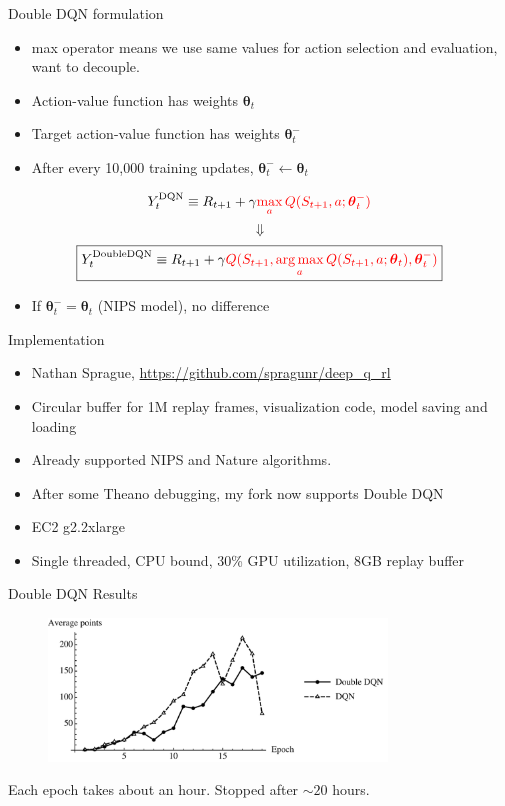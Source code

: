 \documentclass{beamer}
\DeclareMathOperator*{\argmax}{arg\,max}
\begin{document}
\begin{frame}{Double DQN formulation}
  \begin{itemize}
    \item max operator means we use same values for action selection and evaluation, want to decouple.
    \item Action-value function has weights $\boldsymbol{\theta}_t$
    \item Target action-value function has weights $\boldsymbol{\theta}_t^-$
    \item After every 10,000 training updates, $\boldsymbol{\theta}_t^- \leftarrow \boldsymbol{\theta}_t$
  \end{itemize}

  \[Y_t^{\textrm{DQN}} \equiv R_{t+1} + \gamma \textcolor{red}{\max_{a} Q(S_{t+1},a;\boldsymbol{\theta}_t^-)} \]
  \[ \Downarrow \]
  \[\boxed{Y_t^{\textrm{DoubleDQN}} \equiv R_{t+1} + \gamma \textcolor{red}{Q(S_{t+1},\argmax_a Q(S_{t+1},a;\boldsymbol{\theta}_t),\boldsymbol{\theta}_t^-)}} \]
  \begin{itemize}
    \item If $\boldsymbol{\theta}_t^- = \boldsymbol{\theta}_t$ (NIPS model), no difference
  \end{itemize}
\end{frame}

\begin{frame}{Implementation}
  \begin{itemize}
    \item Nathan Sprague, \href{https://github.com/spragunr/deep_q_rl}{https://github.com/spragunr/deep\_q\_rl}
    \item Circular buffer for 1M replay frames, visualization code, model saving and loading
    \item Already supported NIPS and Nature algorithms.
    \item After some Theano debugging, my fork now supports Double DQN
    \item EC2 g2.2xlarge
    \item Single threaded, CPU bound, 30\% GPU utilization, 8GB replay buffer
  \end{itemize}
\end{frame}

\begin{frame}{Double DQN Results}
  \begin{figure}[H]
    \centering
    \includegraphics[width=90mm]{dqn_rewardper.pdf}
  \end{figure}
  Each epoch takes about an hour. Stopped after $\sim 20$ hours.
\end{frame}
\end{document}
